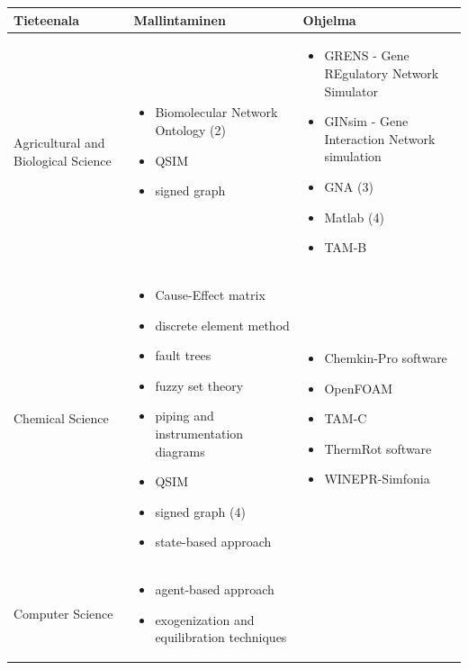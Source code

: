 \documentclass[utf8]{gradu3}
\begin{document}
\begin{longtable}[h]{|p{4cm}|p{6cm}|p{5cm}|}
    \hline
    \textbf{Tieteenala}    &    \textbf{Mallintaminen} & \textbf{Ohjelma}\\
    \hline
    Agricultural and Biological Science & \begin{itemize}
        \item Biomolecular Network Ontology (2)
        \item QSIM
        \item signed graph
    \end{itemize} &
    \begin{itemize}
        \item GRENS - Gene REgulatory Network Simulator
        \item GINsim - Gene Interaction Network simulation
        \item GNA (3)
        \item Matlab (4)
        \item TAM-B
    \end{itemize} 
    \\
    \hline
    Chemical Science & \begin{itemize}
        \item Cause-Effect matrix
        \item discrete element method
        \item fault trees
        \item fuzzy set theory
        \item piping and instrumentation diagrams
        \item QSIM
        \item signed graph (4)       
        \item state-based approach
    \end{itemize} & 
    \begin{itemize}
        \item Chemkin-Pro software
        \item OpenFOAM
        \item TAM-C
        \item ThermRot software
        \item WINEPR-Simfonia
    \end{itemize}
    \\
    \hline
    Computer Science & \begin{itemize}
        \item agent-based approach
        \item exogenization and equilibration techniques

\end{itemize}
\end{longtable}
\end{document}
